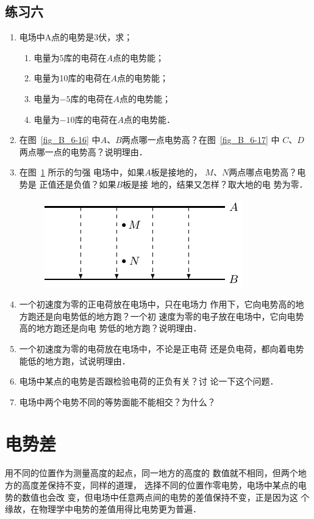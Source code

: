 \subsection*{练习六}

\begin{enumerate}
    \item 电场中A点的电势是3伏，求；
    \begin{enumerate}
        \item 电量为5库的电荷在$A$点的电势能；
        \item 电量为10库的电荷在$A$点的电势能；
        \item 电量为$-5$库的电荷在$A$点的电势能；
        \item 电量为$-10$库的电荷在$A$点的电势能．
    \end{enumerate}
    \item 在图~\ref{fig_B_6-16} 中$A$、$B$两点哪一点电势高？在图~\ref{fig_B_6-17} 中
$C$、$D$两点哪一点的电势高？说明理由．

\item 在图~\ref{fig_B_6-23} 所示的匀强
电场中，如果$A$板是接地的，
$M$、$N$两点哪点电势高？电势是
正值还是负值？如果$B$板是接
地的，结果又怎样？取大地的电
势为零．

\begin{figure}[htbp]
    \centering
    \includegraphics{fig/B/6-23.pdf}
    \caption{}\label{fig_B_6-23}
\end{figure}    

\item 一个初速度为零的正电荷放在电场中，只在电场力
作用下，它向电势高的地方跑还是向电势低的地方跑？一个初
速度为零的电子放在电场中，它向电势高的地方跑还是向电
势低的地方跑？说明理由．
\item 一个初速度为零的电荷放在电场中，不论是正电荷
还是负电荷，都向着电势能低的地方跑，试说明理由．
\item 电场中某点的电势是否跟检验电荷的正负有关？讨
论一下这个问题．
\item 电场中两个电势不同的等势面能不能相交？为什么？
\end{enumerate}

\section{电势差}
用不同的位置作为测量高度的起点，同一地方的高度的
数值就不相同，但两个地方的高度差保持不变，同样的道理，
选择不同的位置作零电势，电场中某点的电势的数值也会改
变，但电场中任意两点间的电势的差值保持不变，正是因为这
个缘故，在物理学中电势的差值用得比电势更为普遍．

